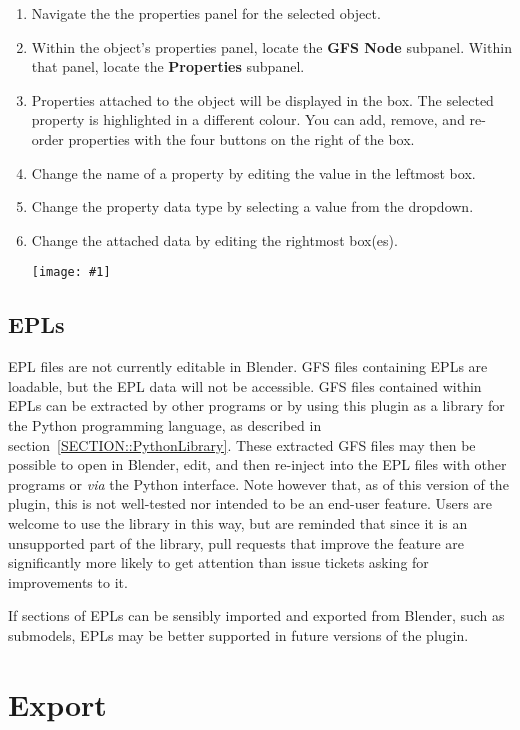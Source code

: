 \documentclass{article}
\newenvironment{guide}[1]
{
	\begin{center}
		\begin{tcolorbox}[%
			colback=black!20, 
			boxrule=0pt, 
			title=Step-by-step: #1,
			enhanced,
			breakable,
			overlay unbroken={%
                \draw[line width=1pt, black, rounded corners]
        	    (frame.north west) rectangle (frame.south east);
			},
    		overlay first={%
        		 \draw[line width=1pt, black, rounded corners]
        	    (frame.south west) -- (frame.north west) -- (frame.north east) -- (frame.south east);
                \draw[line width=1pt, black]
                (frame.south west) -- (frame.south east);
            },
    		overlay middle={%
                \draw[line width=1pt, black]
        	    (frame.north west) rectangle (frame.south east);
        	},
    		overlay last={%
                \draw[line width=1pt, black, rounded corners]
        	    (frame.north west) -- (frame.south west) -- (frame.south east) -- (frame.north east);
                \draw[line width=1pt, black]
                (frame.north west) -- (frame.north east);
           	}
        ]{}
    	\begin{enumerate}
}
{
    		\end{enumerate}
    	\end{tcolorbox}
	\end{center}  	 
}
\newcommand{\guideimage}[1]
{
	\begin{center}
		\texttt{[image: \#1]}
	\end{center}
}
\begin{document}
\begin{guide}{Manipulating GFS Properties}
\item Navigate the the properties panel for the selected object.
\item Within the object's properties panel, locate the \textbf{GFS Node} subpanel. Within that panel, locate the \textbf{Properties} subpanel.
\item Properties attached to the object will be displayed in the box. The selected property is highlighted in a different colour. You can add, remove, and re-order properties with the four buttons on the right of the box.
\item Change the name of a property by editing the value in the leftmost box.
\item Change the property data type by selecting a value from the dropdown.
\item Change the attached data by editing the rightmost box(es).
\guideimage{images/editing_models/edits_gfs_properties.png}
\end{guide}

\clearpage

\subsection{EPLs}
\label{SECTION::Edits::Epls}
EPL files are not currently editable in Blender. GFS files containing EPLs are loadable, but the EPL data will not be accessible. GFS files contained within EPLs can be extracted by other programs or by using this plugin as a library for the Python programming language, as described in section~\ref{SECTION::PythonLibrary}. These extracted GFS files may then be possible to open in Blender, edit, and then re-inject into the EPL files with other programs or \textit{via} the Python interface. Note however that, as of this version of the plugin, this is not well-tested nor intended to be an end-user feature. Users are welcome to use the library in this way, but are reminded that since it is an unsupported part of the library, pull requests that improve the feature are significantly more likely to get attention than issue tickets asking for improvements to it.

If sections of EPLs can be sensibly imported and exported from Blender, such as submodels, EPLs may be better supported in future versions of the plugin.

\clearpage

\section{Export}
\end{document}
